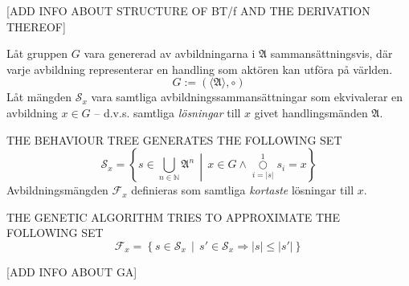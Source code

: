 \documentclass[10pt,a4paper]{article}
\begin{document}
[ADD INFO ABOUT STRUCTURE OF BT/f AND THE DERIVATION THEREOF]

Låt gruppen \(G\) vara genererad av avbildningarna i \(\mathfrak{A}\) sammansättningsvis, där varje avbildning representerar en handling som aktören kan utföra på världen.
\begin{equation}
		G:=\left(\langle\mathfrak{A}\rangle,\circ\right)
\end{equation}
Låt mängden \(\mathscr{S}_x\) vara samtliga avbildningssammansättningar som ekvivalerar en avbildning \(x\in G\) -- d.v.s. samtliga \textit{lösningar} till \(x\) givet handlingsmänden \(\mathfrak{A}\).

THE BEHAVIOUR TREE GENERATES THE FOLLOWING SET
\begin{equation}
		\mathscr{S}_x = \left\{ s \in \bigcup_{n\in \mathbb{N}}\mathfrak{A}^n \,\middle|\, x\in G\wedge\overset{1}{\underset{i=|s|}\bigcirc} s_i = x \right\}
\end{equation}
Avbildningsmängden \(\mathscr{F}_x\) definieras som samtliga \textit{kortaste} lösningar till \(x\).

THE GENETIC ALGORITHM TRIES TO APPROXIMATE THE FOLLOWING SET \begin{equation}
		\mathscr{F}_x=\left\{s\in\mathscr{S}_x \,\middle|\, s'\in \mathscr{S}_x \Rightarrow |s|\le|s'|\right\}
\end{equation}

[ADD INFO ABOUT GA]
\end{document}
